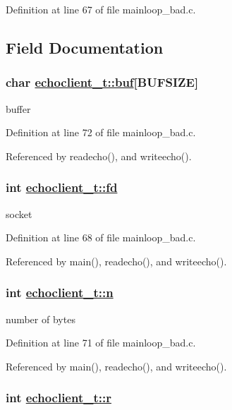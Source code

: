 Definition at line 67 of file mainloop\_\-bad.c.

\subsection{Field Documentation}
\hypertarget{structechoclient__t_o4}{
\subsubsection[buf]{\setlength{\rightskip}{0pt plus 5cm}char \hyperlink{structechoclient__t_o4}{echoclient\_\-t::buf}\mbox{[}BUFSIZE\mbox{]}}}
\label{structechoclient__t_o4}


buffer 



Definition at line 72 of file mainloop\_\-bad.c.

Referenced by readecho(), and writeecho().\hypertarget{structechoclient__t_o0}{
\subsubsection[fd]{\setlength{\rightskip}{0pt plus 5cm}int \hyperlink{structechoclient__t_o0}{echoclient\_\-t::fd}}}
\label{structechoclient__t_o0}


socket 



Definition at line 68 of file mainloop\_\-bad.c.

Referenced by main(), readecho(), and writeecho().\hypertarget{structechoclient__t_o3}{
\subsubsection[n]{\setlength{\rightskip}{0pt plus 5cm}int \hyperlink{structechoclient__t_o3}{echoclient\_\-t::n}}}
\label{structechoclient__t_o3}


number of bytes 



Definition at line 71 of file mainloop\_\-bad.c.

Referenced by main(), readecho(), and writeecho().\hypertarget{structechoclient__t_o1}{
\subsubsection[r]{\setlength{\rightskip}{0pt plus 5cm}int \hyperlink{structechoclient__t_o1}{echoclient\_\-t::r}}}
\label{structechoclient__t_o1}


